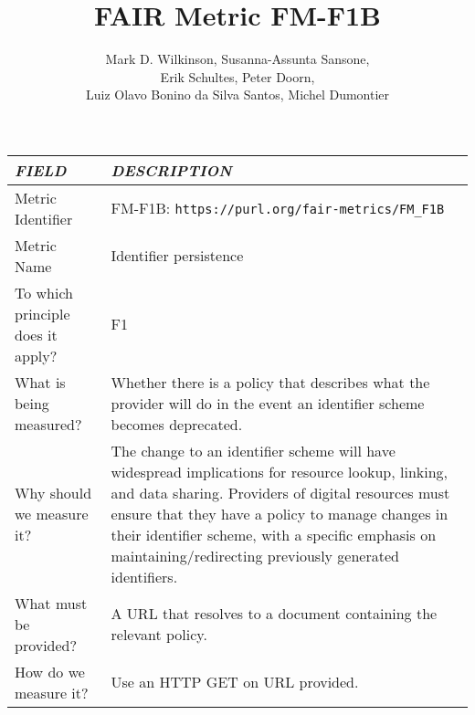\documentclass[english]{article}
\begin{document}
\title{FAIR Metric FM-F1B}

\author{Mark D. Wilkinson, Susanna-Assunta Sansone, \\Erik Schultes, Peter Doorn,\\ 
Luiz Olavo Bonino da Silva Santos, Michel Dumontier}

\maketitle


\centering

\begin{tabular}{|p{5cm}|p{9cm}|}
\hline
\emph{FIELD} & \emph{DESCRIPTION} \\
\hline
Metric Identifier &   FM-F1B: \verb"https://purl.org/fair-metrics/FM_F1B"
 \\


\hline
Metric Name &   
Identifier persistence
 \\



\hline
To which principle does it apply? &   F1\\



\hline
What is being measured? & Whether there is a policy that describes what the provider will do in the event an identifier scheme becomes deprecated.\\



\hline
Why should we measure it? & 

The change to an identifier scheme will have widespread implications for resource lookup, linking, and data sharing. Providers of digital resources must ensure that they have a policy to manage changes in their identifier scheme, with a specific emphasis on maintaining/redirecting previously generated identifiers.
  
\\



\hline
What must be provided? &  
A URL that resolves to a document containing the relevant policy.
 \\



\hline
How do we measure it? &  
Use an HTTP GET on URL provided. \newline
\\




\end{tabular}
\end{document}
